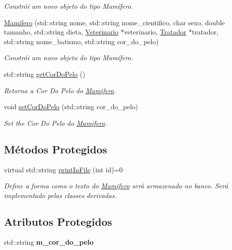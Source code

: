 \begin{DoxyCompactItemize}
\begin{DoxyCompactList}\small\item\em Constrói um novo objeto do tipo Mamífero. \end{DoxyCompactList}\item 
\hyperlink{classMamifero_a9d45fdc114bc1be47cc9d02e39ec59bd}{Mamifero} (std\+::string nome, std\+::string nome\+\_\+cientifico, char sexo, double tamanho, std\+::string dieta, \hyperlink{classVeterinario}{Veterinario} $\ast$veterinario, \hyperlink{classTratador}{Tratador} $\ast$tratador, std\+::string nome\+\_\+batismo, std\+::string cor\+\_\+do\+\_\+pelo)
\begin{DoxyCompactList}\small\item\em Constrói um novo objeto do tipo Mamífero. \end{DoxyCompactList}\item 
std\+::string \hyperlink{classMamifero_a7bf7c25d72549218df4472922ed365de}{get\+Cor\+Do\+Pelo} ()
\begin{DoxyCompactList}\small\item\em Retorna a Cor Do Pelo do \hyperlink{classMamifero}{Mamifero}. \end{DoxyCompactList}\item 
void \hyperlink{classMamifero_af05676a74084b69250490febcff69751}{set\+Cor\+Do\+Pelo} (std\+::string cor\+\_\+do\+\_\+pelo)
\begin{DoxyCompactList}\small\item\em Set the Cor Do Pelo do \hyperlink{classMamifero}{Mamifero}. \end{DoxyCompactList}\end{DoxyCompactItemize}
\subsection*{Métodos Protegidos}
\begin{DoxyCompactItemize}
\item 
virtual std\+::string \hyperlink{classMamifero_ae91b67a8f0f508793a801aadcaa18570}{print\+In\+File} (int id)=0
\begin{DoxyCompactList}\small\item\em Define a forma como o texto do \hyperlink{classMamifero}{Mamifero} será armazenado no banco. Será implementado pelas classes derivadas. \end{DoxyCompactList}\end{DoxyCompactItemize}
\subsection*{Atributos Protegidos}
\begin{DoxyCompactItemize}
\item 
\mbox{\label{classMamifero_a18ace1f3a5c5412f3bfc49293f30522d}} 
std\+::string {\bfseries m\+\_\+cor\+\_\+do\+\_\+pelo}
\end{DoxyCompactItemize}
